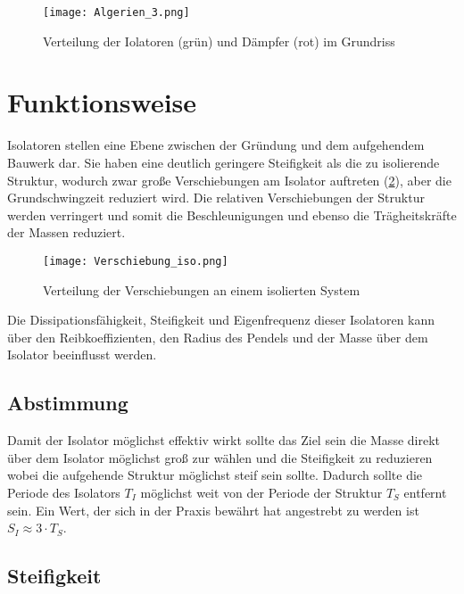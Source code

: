 \begin{figure}[h]
    \centering
    \texttt{[image: Algerien\_3.png]}
    \caption{Verteilung der Iolatoren (grün) und Dämpfer (rot) im Grundriss \cite{AKK}}
	\label{Dampener}
\end{figure}

\pagebreak

\section{Funktionsweise}
\label{sec:funktion}

Isolatoren stellen eine Ebene zwischen der Gründung und dem aufgehendem Bauwerk dar. Sie haben eine deutlich geringere Steifigkeit als die zu isolierende Struktur, wodurch zwar große Verschiebungen am Isolator auftreten (\cref{Verteilung}), aber die Grundschwingzeit reduziert wird.
Die relativen Verschiebungen der Struktur werden verringert und somit die Beschleunigungen und ebenso die Trägheitskräfte der Massen reduziert.

\begin{figure}[h]
    \centering
    \texttt{[image: Verschiebung\_iso.png]}
    \caption{Verteilung der Verschiebungen an einem isolierten System \cite{Kelly}}
	\label{Verteilung}
\end{figure}

Die Dissipationsfähigkeit, Steifigkeit und Eigenfrequenz dieser Isolatoren kann über den Reibkoeffizienten, den Radius des Pendels und der Masse über dem Isolator beeinflusst werden.

\subsection{Abstimmung}
\label{sec:abstimmung}

Damit der Isolator möglichst effektiv wirkt sollte das Ziel sein die Masse direkt über dem Isolator möglichst groß zur wählen und die Steifigkeit zu reduzieren wobei die aufgehende Struktur möglichst steif sein sollte.
Dadurch sollte die Periode des Isolators $T_I$ möglichst weit von der Periode der Struktur $T_S$ entfernt sein.
Ein Wert, der sich in der Praxis bewährt hat angestrebt zu werden ist $S_I \approx 3 \cdot T_S$.

\subsection{Steifigkeit}
\label{sec:steifigkeit}

